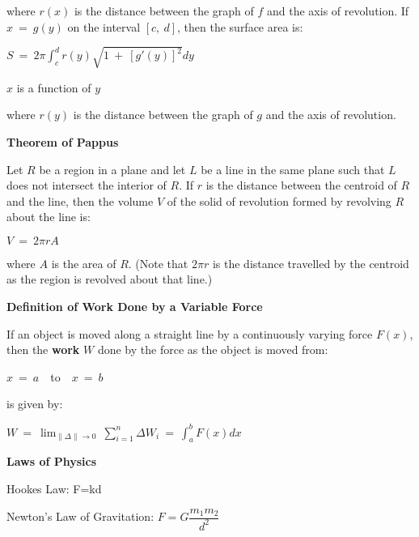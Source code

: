 \documentclass{article}
\begin{document}
\begin{large}
\hspace{0.1in} where $r(x)$ is the distance between the graph of $f$ and the axis of revolution.  If $x\ =\ g(y)$ on the interval $[c,\ d]$, then the surface area is:

\hspace{1.5in} $S\ =\ 2\pi\displaystyle\int^{d}_{c}r(y)\sqrt{1\ +\ [g'(y)]^{2}}dy$ \begin{Large} $x$ is a function of $y$\end{Large}

\hspace{0.1in} where $r(y)$ is the distance between the graph of $g$ and the axis of revolution.

\vspace{1.6in}
\textbf{Theorem of Pappus}

\hspace{0.1in}  Let $R$ be a region in a plane and let $L$ be a line in the same plane such that $L$ does not intersect the interior of $R$.  If $r$ is the distance between the centroid of $R$ and the line, then the volume $V$ of the solid of revolution formed by revolving $R$ about the line is:

\hspace{2.8in} $V\ =\ 2\pi rA$

\hspace{0.1in} where $A$ is the area of $R$. (Note that $2\pi r$ is the distance travelled by the centroid as the region is revolved about that line.)

\vspace{0.4in}
\textbf{Definition of Work Done by a Variable Force}

\hspace{0.1in} If an object is moved along a straight line by a continuously varying force $F(x)$, then the \textbf{work} $W$ done by the force as the object is moved from:

\hspace{2.5in} $x\ =\ a$\ \ to\ \ $x\ =\ b$

\hspace{0.1in} is given by:

\hspace{2.0in} $W\ =\ \displaystyle\lim_{\|\Delta\|\rightarrow 0}\ \displaystyle\sum^{n}_{i=1}\Delta W_{i}\ =\ \displaystyle\int^{b}_{a}F(x)dx$

\textbf{Laws of Physics}

Hookes Law: \text\large{F=kd}

Newton's Law of Gravitation: $F=G\dfrac{m_1m_2}{d^2}$


\end{large}
\end{document}
